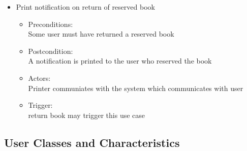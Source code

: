 \documentclass{article}
\begin{document}
\begin{enumerate}
\begin{itemize}
\item Print notification on return of reserved book\\ 
\begin{itemize}
\item Preconditions:\\ Some user must have returned a reserved book \\ 
 \item Postcondition:\\ A notification is printed to the user who reserved the book\\ 
 \item Actors: \\ Printer communiates with the system which communicates with user\\ 
 \item Trigger:\\ return book may trigger this use case\\ 
\end{itemize}

\end{itemize}
\end{enumerate}

\subsection{User Classes and Characteristics}
\end{document}

